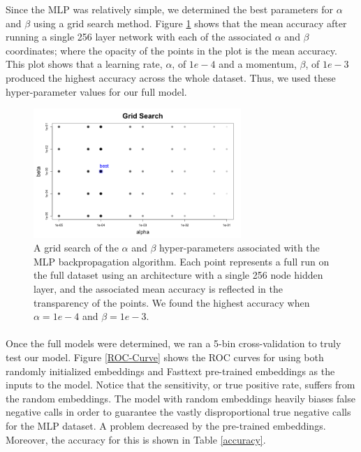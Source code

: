 \documentclass[11.5pt]{article}
\newcounter{Figure}
\newcounter{graphics}
\begin{document}
Since the MLP was relatively simple, we determined the best parameters for $\alpha$ and $\beta$ using a grid search method. Figure \ref{GridSearch} shows that the mean accuracy after running a single 256 layer network with each of the associated $\alpha$ and $\beta$ coordinates; where the opacity of the points in the plot is the mean accuracy. This plot shows that a learning rate, $\alpha$, of $1e-4$ and a momentum, $\beta$, of $1e-3$ produced the highest accuracy across the whole dataset. Thus, we used these hyper-parameter values for our full model. 


 \begin{figure}[h!]
\centerline{\includegraphics[width=0.7\textwidth]{report_mlp/GridSearch.png}}
  \caption{\small A grid search of the $\alpha$ and $\beta$ hyper-parameters associated with the MLP backpropagation algorithm. Each point represents a full run on the full dataset using an architecture with a single 256 node hidden layer, and the associated mean accuracy is reflected in the transparency of the points. We found the highest accuracy when $\alpha = 1e-4$ and $\beta =1e-3$. }
\label{GridSearch}
\end{figure}

 
 \paragraph{} Once the full models were determined, we ran a 5-bin cross-validation to truly test our model. Figure \ref{ROC-Curve} shows the ROC curves for using both randomly initialized embeddings and Fasttext pre-trained embeddings as the inputs to the model. Notice that the sensitivity, or true positive rate, suffers from the random embeddings. The model with random embeddings heavily biases false negative calls in order to guarantee the vastly disproportional true negative calls for the MLP dataset. A problem decreased by the pre-trained embeddings. Moreover, the accuracy for this is shown in Table \ref{accuracy}.  
 
\end{document}

